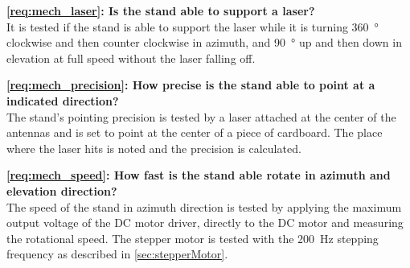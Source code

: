 \textbf{\autoref{req:mech_laser}: Is the stand able to support a laser?}\\
It is tested if the stand is able to support the laser while it is turning \SI{360}{\degree} clockwise and then counter clockwise in azimuth, and \SI{90}{\degree} up and then down in elevation at full speed without the laser falling off.

\textbf{\autoref{req:mech_precision}: How precise is the stand able to point at a indicated direction?}\\
The stand's pointing precision is tested by a laser attached at the center of the antennas and is set to point at the center of a piece of cardboard. The place where the laser hits is noted and the precision is calculated.

\textbf{\autoref{req:mech_speed}: How fast is the stand able rotate in azimuth and elevation direction?}\\
The speed of the stand in azimuth direction is tested by applying the maximum output voltage of the DC motor driver, directly to the DC motor and measuring the rotational speed. 
The stepper motor is tested with the \SI{200}{\hertz} stepping frequency as described in \autoref{sec:stepperMotor}. 

\newpage
